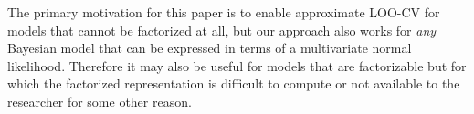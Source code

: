 \documentclass[11pt]{article}
\begin{document}
The primary motivation for this paper is to enable approximate LOO-CV for models
that cannot be factorized at all, but our approach also works for \emph{any}
Bayesian model that can be expressed in terms of a multivariate normal
likelihood. Therefore it may also be useful for models that are factorizable but
for which the factorized representation is difficult to compute or not available
to the researcher for some other reason.






\end{document}
